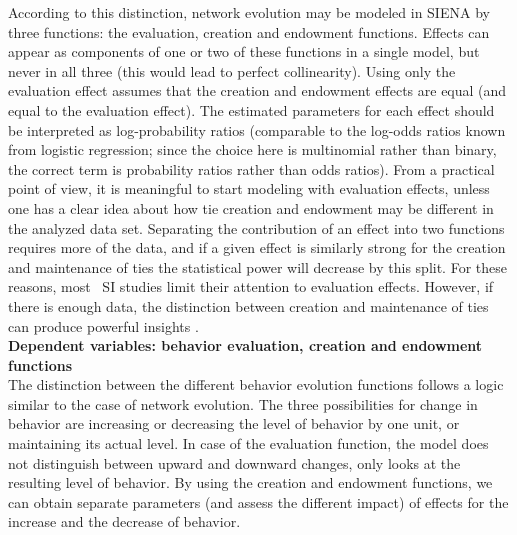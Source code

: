 \documentclass[a4paper,fleqn,11pt]{article}
\newcommand{\+}{\, + \,}
\newcommand{\SI}{{\sf SIENA }}
\begin{document}
According to this distinction, network evolution may be modeled
in \SI by three functions: the evaluation, creation and endowment functions.
Effects can appear as components of one or two of these functions in a single model,
but never in all three (this would lead to perfect collinearity).
Using only the evaluation effect assumes that the creation and endowment
effects are equal (and equal to the evaluation effect). The estimated
parameters for each effect should be interpreted as log-probability ratios
(comparable to the log-odds ratios known from logistic regression;
since the choice here is multinomial rather than binary, the correct term
is probability ratios rather than odds ratios).
From a practical point of view, it is meaningful to start modeling with
evaluation effects, unless one has a clear idea about how tie creation
and endowment may be different in the analyzed data set.
Separating the contribution of an effect into two functions requires
more of the data, and if a given effect is similarly strong for the
creation and maintenance of ties the statistical power will
decrease by this split.
For these reasons, most  \
SI studies limit their
attention to evaluation effects. However, if there is enough data,
the distinction between creation and maintenance of ties can
produce powerful insights \citep[e.g.,][]{Cheadle_etal2013}.\\

\noindent
\textbf{Dependent variables: behavior evaluation, creation and endowment functions}\\

The distinction between the different behavior evolution functions follows
a logic similar to the case of network evolution. The three possibilities
for change in behavior are increasing or decreasing the level of behavior
by one unit, or maintaining its actual level. In case of the evaluation
function, the model does not distinguish between upward and downward changes,
only looks at the resulting level of behavior. By using the creation and
endowment functions, we can obtain separate parameters (and assess the
different impact) of effects for the increase and the decrease of behavior.
\end{document}
